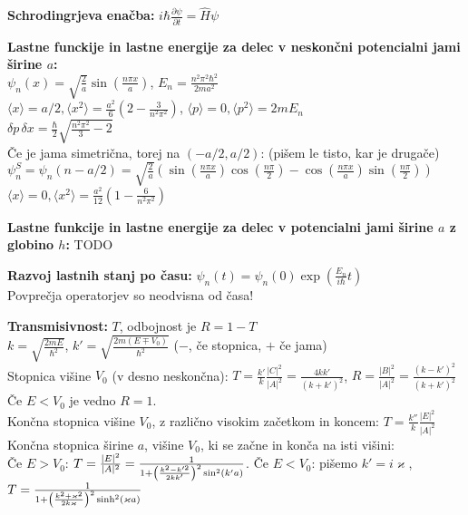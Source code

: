 \documentclass[a4paper, oneside, 12pt]{article}
\theoremstyle{definition}
\renewcommand{\kappa}{\varkappa}
\begin{document}
\textbf{Schrodingrjeva enačba:} $i\hbar \frac{\partial\psi}{\partial t} = \hat{H}\psi$

\textbf{Lastne funckije in lastne energije za delec v neskončni potencialni jami širine $a$:} \\
$\psi_n(x) = \sqrt{\frac{2}{a}} \sin(\frac{n \pi x}{a})$, $E_n = \frac{n^2 \pi^2 \hbar^2}{2 m a^2}$\\
$\langle x\rangle = a/2, \langle x^2\rangle = \frac{a^2}{6} (2 - \frac{3}{n^2 \pi^2})$, $\langle p\rangle = 0, \langle p^2\rangle = 2 m E_n$\\
$\delta p\, \delta x = \frac{\hbar}{2} \sqrt{\frac{n^2 \pi^2}{3} - 2}$\\
Če je jama simetrična, torej na $(-a/2, a/2)$: (pišem le tisto, kar je drugače)\\
$\psi_n^S = \psi_n (n - a/2) = \sqrt{\frac{2}{a}} \left(\sin(\frac{n \pi x}{a}) \cos(\frac{n \pi}{2}) -  \cos(\frac{n \pi x}{a}) \sin(\frac{n \pi}{2})\right)$\\
$\langle x\rangle  = 0, \langle x^2\rangle = \frac{a^2}{12} (1 - \frac{6}{n^2 \pi^2})$


\textbf{Lastne funkcije in lastne energije za delec v potencialni jami širine $a$ z globino $h$:} TODO

\textbf{Razvoj lastnih stanj po času:} $\psi_n (t) = \psi_n (0) \exp(\frac{E_n}{i \hbar} t)$\\
Povprečja operatorjev so neodvisna od časa!

\textbf{Transmisivnost:} $T$, odbojnost je $R = 1 - T$\\
$k = \sqrt{\frac{2 m E}{\hbar^2}}$, $k' = \sqrt{\frac{2 m (E \mp V_0)}{\hbar^2}}$ ($-$,
   če stopnica, $+$ če jama)\\
Stopnica višine $V_0$ (v desno neskončna):
$T = \frac{k'}{k} \frac{|C|^2}{|A|^2} = \frac{4 k k'}{(k + k')^2}$,
$R = \frac{|B|^2}{|A|^2} = \frac{(k - k')^2}{(k + k')^2}$\\
Če $E < V_0$ je vedno $R = 1$.\\
Končna stopnica višine $V_0$, z različno visokim začetkom in koncem:
  $T = \frac{k''}{k} \frac{|E|^2}{|A|^2}$\\
Končna stopnica širine $a$, višine $V_0$, ki se začne in konča na isti višini:\\
Če  $E > V_0$: $T = \frac{|E|^2}{|A|^2} = \frac{1}{%
                    1+ \left(\frac{k^2 - k'^2}{2 k k'}\right)^2 \sin^2 (k'a)}$.
Če $E < V_0$: pišemo $k' = i \kappa$, $T = \frac{1}{%
                    1+  \left(\frac{k^2 + \kappa^2}
                                                     {2 k \kappa}\right)^2 \sinh^2 (\kappa a)}$
\end{document}
